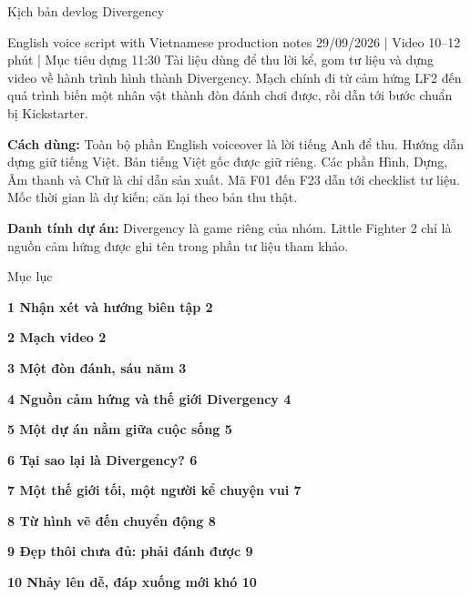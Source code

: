 \documentclass[10pt,a4paper]{article}
\begin{document}
Kịch bản devlog Divergency\par

English voice script with Vietnamese production notes 29/09/2026 | Video 10–12 phút | Mục tiêu dựng 11:30 Tài liệu dùng để thu lời kể, gom tư liệu và dựng video về hành trình hình thành Divergency. Mạch chính đi từ cảm hứng LF2 đến quá trình biến một nhân vật thành đòn đánh chơi được, rồi dẫn tới bước chuẩn bị Kickstarter.\par

\textbf{Cách dùng:}  Toàn bộ phần English voiceover là lời tiếng Anh để thu. Hướng dẫn dựng giữ tiếng Việt. Bản tiếng Việt gốc được giữ riêng. Các phần Hình, Dựng, Âm thanh và Chữ là chỉ dẫn sản xuất. Mã F01 đến F23 dẫn tới checklist tư liệu. Mốc thời gian là dự kiến; căn lại theo bản thu thật.\par

\textbf{Danh tính dự án:}  Divergency là game riêng của nhóm. Little Fighter 2 chỉ là nguồn cảm hứng được ghi tên trong phần tư liệu tham khảo.\par

Mục lục\par

\textbf{1 Nhận xét và hướng biên tập 2}\par

\textbf{2 Mạch video 2}\par

\textbf{3 Một đòn đánh, sáu năm 3}\par

\textbf{4 Nguồn cảm hứng và thế giới Divergency 4}\par

\textbf{5 Một dự án nằm giữa cuộc sống 5}\par

\textbf{6 Tại sao lại là Divergency? 6}\par

\textbf{7 Một thế giới tối, một người kể chuyện vui 7}\par

\textbf{8 Từ hình vẽ đến chuyển động 8}\par

\textbf{9 Đẹp thôi chưa đủ: phải đánh được 9}\par

\textbf{10 Nhảy lên dễ, đáp xuống mới khó 10}\par
\end{document}
